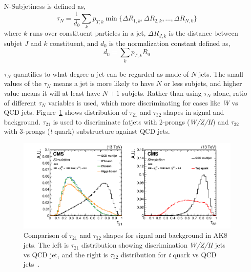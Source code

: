 N-Subjetiness is defined as,
\begin{equation}
  \tau_N = \frac{1}{d_0} \sum_k p_{T,k} \min \{ \Delta R_{1,k}, \Delta R_{2,k}, \ldots , \Delta R_{N,k} \}
\end{equation}
where \( k \) runs over constituent particles in a jet, \( \Delta R_{J,k} \)
is the distance between subjet \( J \) and \( k \) constituent, and \( d_0 \)
is the normalization constant defined as,
\begin{equation}
  d_0 = \sum_k p_{T,k} R_0
\end{equation}

\( \tau_N \) quantifies to what degree a jet can be regarded as made of \( N \) jets.
The small values of the \( \tau_N \) means a jet is more likely to have
\( N \) or less subjets, and higher value means it will at least have \( N + 1\)
subjets. Rather than using \( \tau_N \) alone, ratio of different \( \tau_N \)
variables is used, which more discriminating for cases like \textit{W} vs QCD jets.
Figure~\ref{fig:cms-tau21-tau32-comparison} shows distribution of
\( \tau_{21} \) and \( \tau_{32} \) shapes in signal and background.
\( \tau_{21} \) is used to discriminate fatjets with 2-prongs (\textit{W/Z/H})
and \( \tau_{32} \) with 3-prongs (\textit{t} quark) substructure against QCD jets.

\begin{figure}[!ht]
  \centering
  \includegraphics[width=\textwidth]{figures/CMS_JME_18_002_Figure_003.pdf}
  \caption[Comparison of \( \tau_{21} \) and \( \tau_{32} \) shapes for signal and background in AK8 jets]%
  {Comparison of \( \tau_{21} \) and \( \tau_{32} \) shapes for signal and background in AK8 jets.
    The left is \( \tau_{21} \) distribution showing discrimination \textit{W/Z/H} jets
    vs QCD jet, and the right is \( \tau_{32} \) distribution for \textit{t} quark vs
    QCD jets~\cite{cms-jme-deep-tagger}.}%
  \label{fig:cms-tau21-tau32-comparison}
\end{figure}

